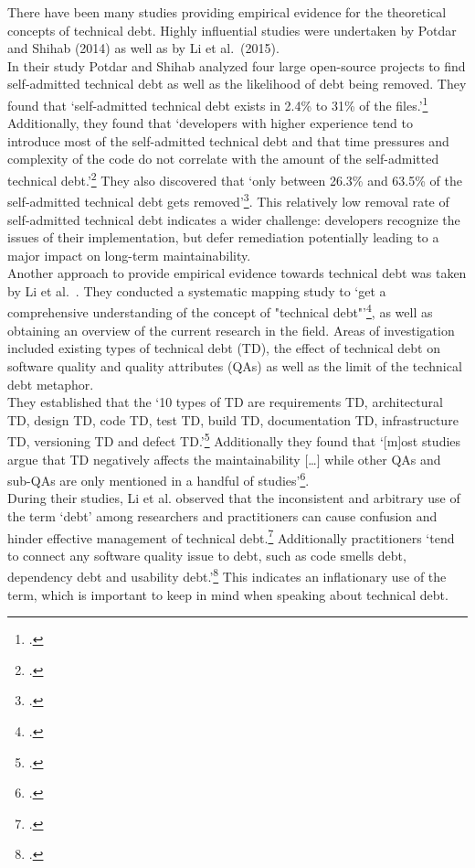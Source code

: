 There have been many studies providing empirical evidence for the theoretical concepts of technical debt. Highly influential studies were undertaken by Potdar and Shihab (2014) as well as by Li et al.\ (2015).\\
In their study Potdar and Shihab analyzed four large open-source projects to find self-admitted technical debt as well as the likelihood of debt being removed. They found that `self-admitted technical debt exists in 2.4\% to 31\% of the files.'\footcite[1]{potdarExploratoryStudySelfAdmitted2014}
Additionally, they found that `developers with higher experience tend to introduce most of the self-admitted technical debt and that time pressures and complexity of the code do not correlate with the amount of the self-admitted technical debt.'\footcite[1]{potdarExploratoryStudySelfAdmitted2014}
They also discovered that `only between 26.3\% and 63.5\% of the self-admitted technical debt gets removed'\footcite[1]{potdarExploratoryStudySelfAdmitted2014}. This relatively low removal rate of self-admitted technical debt indicates a wider challenge:
developers recognize the issues of their implementation, but defer remediation potentially leading to a major impact on long-term maintainability.\\
Another approach to provide empirical evidence towards technical debt was taken by Li et al.\ . They conducted a systematic mapping study to `get a comprehensive understanding of the concept of "technical debt"'\footcite[194]{liSystematicMappingStudy2015}, as well as obtaining an overview of the current research in the field.
Areas of investigation included existing types of technical debt (TD), the effect of technical debt on software quality and quality attributes (QAs) as well as the limit of the technical debt metaphor.\\
They established that the `10 types of TD are requirements TD, architectural TD, design TD, code TD, test TD, build TD, documentation TD, infrastructure TD, versioning TD and defect TD.'\footcite[215]{liSystematicMappingStudy2015}
Additionally they found that `[m]ost studies argue that TD negatively affects the maintainability [\ldots] while other QAs and sub-QAs are only mentioned in a handful of studies'\footcite[215]{liSystematicMappingStudy2015}.\\
During their studies,  Li et al. observed that the inconsistent and arbitrary use of the term `debt' among researchers and practitioners can cause confusion and hinder effective management of technical debt.\footcite[211]{liSystematicMappingStudy2015} Additionally practitioners `tend to connect any software quality issue to debt, such as code smells debt, dependency debt and usability debt.'\footcite[212]{liSystematicMappingStudy2015}
This indicates an inflationary use of the term, which is important to keep in mind when speaking about technical debt.\\

